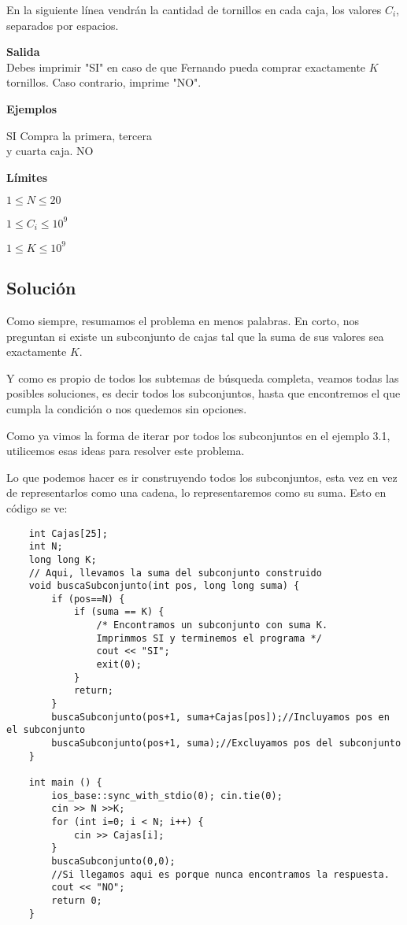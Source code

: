 En la siguiente línea vendrán la cantidad de tornillos en cada caja, los valores \(C_i\), separados por espacios.

\textbf{Salida}\\
Debes imprimir "SI" en caso de que Fernando pueda comprar exactamente \(K\) tornillos. Caso contrario, imprime "NO".

\textbf{Ejemplos}\\
\begin{casebox3}
	{SI}
	{
		Compra la primera, tercera\\
		y cuarta caja.
	}
	{NO}
	{}
\end{casebox3}

\textbf{Límites}
\begin{plimits}
	\item \(1\leq N\leq 20 \)
	\item \(1\leq C_i\leq 10^9 \)
	\item \(1\leq K\leq 10^9 \)
\end{plimits}

\subsection*{Solución}
Como siempre, resumamos el problema en menos palabras. En corto, nos preguntan si existe un subconjunto de cajas tal que la suma de sus valores sea exactamente \(K\).

Y como es propio de todos los subtemas de búsqueda completa, veamos todas las posibles soluciones, es decir todos los subconjuntos, hasta que encontremos el que cumpla la condición o nos quedemos sin opciones.

Como ya vimos la forma de iterar por todos los subconjuntos en el ejemplo 3.1, utilicemos esas ideas para resolver este problema.

Lo que podemos hacer es ir construyendo todos los subconjuntos, esta vez en vez de representarlos como una cadena, lo representaremos como su suma. Esto en código se ve:
\newpage
\begin{lstlisting}
	int Cajas[25];
	int N;
	long long K;
	// Aqui, llevamos la suma del subconjunto construido
	void buscaSubconjunto(int pos, long long suma) {
		if (pos==N) {
			if (suma == K) {
				/* Encontramos un subconjunto con suma K.
				Imprimmos SI y terminemos el programa */
				cout << "SI";
				exit(0);
			}
			return;
		}
		buscaSubconjunto(pos+1, suma+Cajas[pos]);//Incluyamos pos en el subconjunto
		buscaSubconjunto(pos+1, suma);//Excluyamos pos del subconjunto	
	}
	
	int main () {
		ios_base::sync_with_stdio(0); cin.tie(0);
		cin >> N >>K;
		for (int i=0; i < N; i++) {
			cin >> Cajas[i];
		}
		buscaSubconjunto(0,0);
		//Si llegamos aqui es porque nunca encontramos la respuesta.
		cout << "NO";
		return 0;
	}
\end{lstlisting}


